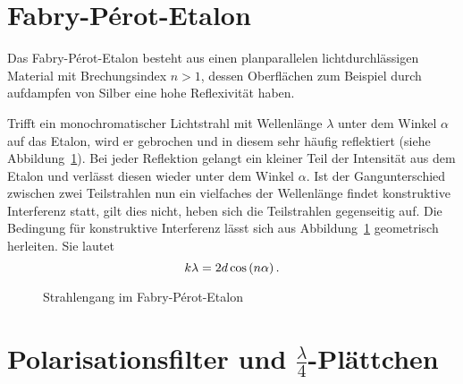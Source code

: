 \section{Fabry-Pérot-Etalon}

Das Fabry-Pérot-Etalon besteht aus einen planparallelen lichtdurchlässigen
Material mit Brechungsindex $n>1$, dessen Oberflächen zum Beispiel durch
aufdampfen von Silber eine hohe Reflexivität haben.

Trifft ein monochromatischer Lichtstrahl mit Wellenlänge $\lambda$ unter dem
Winkel $\alpha$ auf das Etalon, wird er gebrochen und in diesem sehr häufig
reflektiert (siehe Abbildung~\ref{fig:Etalon}). Bei jeder Reflektion gelangt
ein kleiner Teil der Intensität aus dem Etalon und verlässt diesen wieder unter
dem Winkel $\alpha$. Ist der Gangunterschied zwischen zwei Teilstrahlen nun ein
vielfaches der Wellenlänge findet konstruktive Interferenz statt, gilt dies
nicht, heben sich die Teilstrahlen gegenseitig auf. Die Bedingung für
konstruktive Interferenz lässt sich aus Abbildung~\ref{fig:Etalon} geometrisch
herleiten. Sie lautet
\[
    k\lambda = 2d\cos\del{n\alpha}.
\]
\begin{figure}
    \centering
    \caption{%
        Strahlengang im Fabry-Pérot-Etalon
    }
    \label{fig:Etalon}
\end{figure}

\section{Polarisationsfilter und $\frac{\lambda}4$-Plättchen}


